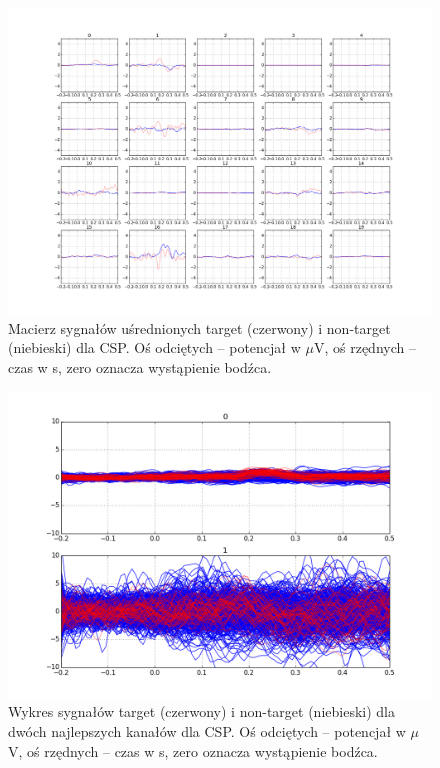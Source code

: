\documentclass[licencjacka,openright]{pracamgr}
\begin{document}
\begin{figure}
\centering
\includegraphics[scale=0.35, trim=10mm 25mm 10mm 25mm, clip=True]{pics/macierz_csp.png}
\caption{Macierz sygnałów uśrednionych target (czerwony) i non-target (niebieski) dla CSP. Oś odciętych -- potencjał w  $\mu$V, oś rzędnych -- czas w s, zero oznacza wystąpienie bodźca.}
\label{macierz_csp}
\end{figure}

\begin{figure}
\centering
\includegraphics[scale=0.55, trim=10mm 15mm 10mm 15mm, clip=True]{pics/sygnal_csp.png}
\caption{Wykres sygnałów target (czerwony) i non-target (niebieski) dla dwóch najlepszych kanałów dla CSP. Oś odciętych -- potencjał w  $\mu$V, oś rzędnych -- czas w s, zero oznacza wystąpienie bodźca.}
\label{sygnal_csp}
\end{figure}
\end{document}
